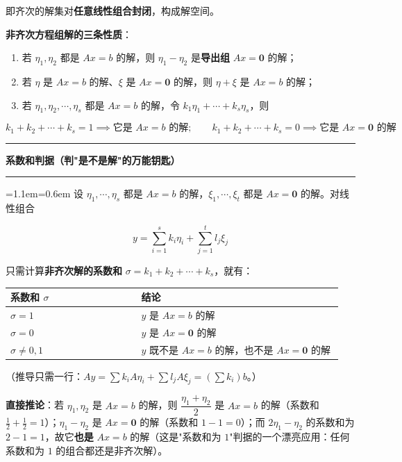 \documentclass[11pt,openany,UTF8]{ctexbook}
\newcommand{\callouthead}[2]{%
  \par\addvspace{7pt}\noindent
  {\color{#1}\rule[-0.15em]{3pt}{1.05em}}\hspace{0.5em}%
  {\bfseries\color{#1}#2}\par\nobreak\vspace{-0.35em}%
  {\color{rulesep}\hrule height 0.4pt}\nobreak\vspace{0.45em}%
  \begingroup\small\setlength{\parindent}{0pt}%
  \leftskip=1.1em\rightskip=0.6em\noindent\ignorespaces}
\newcommand{\calloutend}{\par\endgroup\addvspace{7pt}}
\newenvironment{callkey}[1]{\callouthead{keybar}{#1}}{\calloutend}
\begin{document}
即齐次的解集对\textbf{任意线性组合封闭}，构成解空间。

\textbf{非齐次方程组解的三条性质}：

\begin{enumerate}
\item 若 $\eta_1,\eta_2$ 都是 $Ax=b$ 的解，则 $\eta_1-\eta_2$ 是\textbf{导出组} $Ax=\mathbf{0}$ 的解；
\item 若 $\eta$ 是 $Ax=b$ 的解、$\xi$ 是 $Ax=\mathbf{0}$ 的解，则 $\eta+\xi$ 是 $Ax=b$ 的解；
\item 若 $\eta_1,\eta_2,\cdots,\eta_s$ 都是 $Ax=b$ 的解，令 $k_1\eta_1+\cdots+k_s\eta_s$，则
\end{enumerate}
\[k_1+k_2+\cdots+k_s=1\implies \text{它是 }Ax=b\text{ 的解};\qquad
k_1+k_2+\cdots+k_s=0\implies \text{它是 }Ax=\mathbf{0}\text{ 的解}\]

\begin{callkey}{系数和判据（判"是不是解"的万能钥匙）}
设 $\eta_1,\cdots,\eta_s$ 都是 $Ax=b$ 的解，$\xi_1,\cdots,\xi_t$ 都是 $Ax=\mathbf{0}$ 的解。对线性组合

\[y=\sum_{i=1}^{s}k_i\eta_i+\sum_{j=1}^{t}l_j\xi_j\]

只需计算\textbf{非齐次解的系数和} $\sigma=k_1+k_2+\cdots+k_s$，就有：

\begingroup\small\setlength{\tabcolsep}{4.0pt}
\begin{longtable}{@{}L{0.3752\linewidth}L{0.5704\linewidth}@{}}
\toprule
\textbf{系数和 $\sigma$} & \textbf{结论} \\
\midrule
\endhead
$\sigma=1$ & $y$ 是 $Ax=b$ 的解 \\
$\sigma=0$ & $y$ 是 $Ax=\mathbf{0}$ 的解 \\
$\sigma\ne0,1$ & $y$ 既不是 $Ax=b$ 的解，也不是 $Ax=\mathbf{0}$ 的解 \\
\bottomrule
\end{longtable}
\endgroup

（推导只需一行：$Ay=\sum k_iA\eta_i+\sum l_jA\xi_j=\left(\sum k_i\right)b$。）

\textbf{直接推论}：若 $\eta_1,\eta_2$ 是 $Ax=b$ 的解，则 $\dfrac{\eta_1+\eta_2}{2}$ 是 $Ax=b$ 的解（系数和 $\tfrac12+\tfrac12=1$）；$\eta_1-\eta_2$ 是 $Ax=\mathbf{0}$ 的解（系数和 $1-1=0$）；而 $2\eta_1-\eta_2$ 的系数和为 $2-1=1$，故它\textbf{也是} $Ax=b$ 的解（这是"系数和为 $1$"判据的一个漂亮应用：任何系数和为 $1$ 的组合都还是非齐次解）。

\end{callkey}
\end{document}
